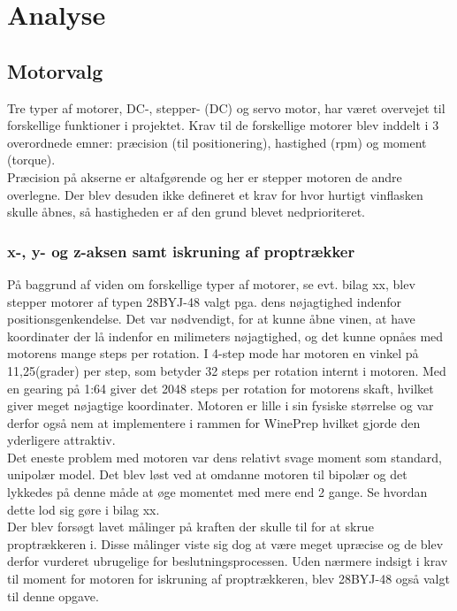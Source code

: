\section{Analyse}
\subsection{Motorvalg}
Tre typer af motorer, DC-, stepper- (DC) og servo motor, har været overvejet til forskellige funktioner i projektet. Krav til de forskellige motorer blev inddelt i 3 overordnede emner: præcision (til positionering), hastighed (rpm) og moment (torque).\\

Præcision på akserne er altafgørende og her er stepper motoren de andre overlegne. Der blev desuden ikke defineret et krav for hvor hurtigt vinflasken skulle åbnes, så hastigheden er af den grund blevet nedprioriteret.

\subsubsection{x-, y- og z-aksen samt iskruning af proptrækker}
På baggrund af viden om forskellige typer af motorer, se evt. bilag xx, blev stepper motorer af typen 28BYJ-48 valgt pga. dens nøjagtighed indenfor positionsgenkendelse. Det var nødvendigt, for at kunne åbne vinen, at have koordinater der lå indenfor en milimeters nøjagtighed, og det kunne opnåes med motorens mange steps per rotation. I 4-step mode har motoren en vinkel på 11,25(grader) per step, som betyder 32 steps per rotation internt i motoren. Med en gearing på 1:64 giver det 2048 steps per rotation for motorens skaft, hvilket giver meget nøjagtige koordinater. Motoren er lille i sin fysiske størrelse og var derfor også nem at implementere i rammen for WinePrep hvilket gjorde den yderligere attraktiv.\\

Det eneste problem med motoren var dens relativt svage moment som standard, unipolær model. Det blev løst ved at omdanne motoren til bipolær og det lykkedes på denne måde at øge momentet med mere end 2 gange. Se hvordan dette lod sig gøre i bilag xx.\\

Der blev forsøgt lavet målinger på kraften der skulle til for at skrue proptrækkeren i. Disse målinger viste sig dog at være meget upræcise og de blev derfor vurderet ubrugelige for beslutningsprocessen. Uden nærmere indsigt i krav til moment for motoren for iskruning af proptrækkeren, blev 28BYJ-48 også valgt til denne opgave.

